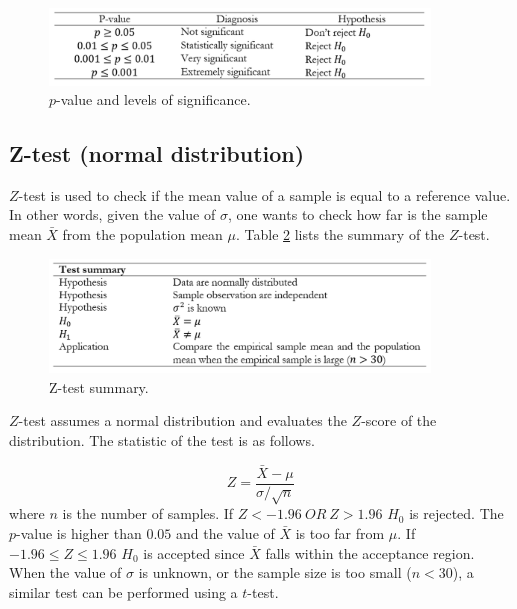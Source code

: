 \begin{figure}[hbt!]
\centering
\includegraphics[width=0.9\textwidth]{SectionLetsMath/elemStat_figures/tab_statTest.png}
\captionsetup{type=table}
\caption{$p$-value and levels of significance.}
\label{tab_statTest}
\end{figure}

\subsection{Z-test (normal distribution)}
$Z$-test is used to check if the mean value of a sample is equal to a reference value. In other words, given the value of $\sigma$, one wants to check how far is the sample mean $\bar{X}$ from the population mean $\mu$. Table \ref{tab_zTest} lists the summary of the $Z$-test.


\begin{figure}[hbt!]
\centering
\includegraphics[width=0.9\textwidth]{SectionLetsMath/elemStat_figures/tab_zTest.png}
\captionsetup{type=table}
\caption{Z-test summary.}
\label{tab_zTest}
\end{figure}

$Z$-test assumes a normal distribution and evaluates the $Z$-score of the distribution. The statistic of the test is as follows.

\begin{equation}
Z=\frac{\bar{X}-\mu}{\sigma/\sqrt n}
\label{eq_ztest}
\end{equation}
where $n$ is the number of samples. If $Z<-1.96\ OR\ Z>1.96$ $H_0$ is rejected. The $p$-value is higher than $0.05$ and the value of $\bar{X}$ is too far from $\mu$. If $-1.96\le Z\le1.96$ $H_0$ is accepted since $\bar{X}$ falls within the acceptance region. When the value of $\sigma$ is unknown, or the sample size is too small ($n<30$), a similar test can be performed using a $t$-test.

